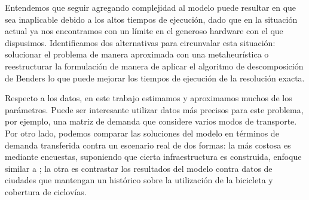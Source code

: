 Entendemos que seguir agregando complejidad al modelo puede resultar en que sea inaplicable debido a los altos tiempos de ejecución, dado que en la situación actual ya nos encontramos con un límite en el generoso hardware con el que dispusimos. Identificamos dos alternativas para circunvalar esta situación: solucionar el problema de manera aproximada con una metaheurística o reestructurar la formulación de manera de aplicar el algoritmo de descomposición de Benders \parencite{bucarey2022, crainic2021} lo que puede mejorar los tiempos de ejecución de la resolución exacta.

Respecto a los datos, en este trabajo estimamos y aproximamos muchos de los parámetros. Puede ser interesante utilizar datos más precisos para este problema, por ejemplo, una matriz de demanda que considere varios modos de transporte. Por otro lado, podemos comparar las soluciones del modelo en términos de demanda transferida contra un escenario real de dos formas: la más costosa es mediante encuestas, suponiendo que cierta infraestructura es construida, enfoque similar a \parencite{shwe2014}; la otra es contrastar los resultados del modelo contra datos de ciudades que mantengan un histórico sobre la utilización de la bicicleta y cobertura de ciclovías.
